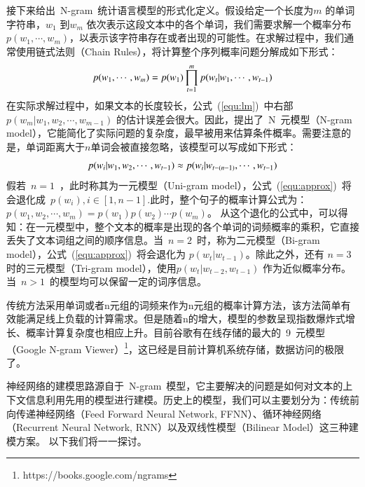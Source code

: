 接下来给出~N-gram~统计语言模型的形式化定义。假设给定一个长度为$m$ 的单词字符串，$w_1$ 到$w_m$ 依次表示这段文本中的各个单词，我们需要求解一个概率分布$p(w_1,\cdots,w_m)$，以表示该字符串存在或者出现的可能性。在求解过程中，我们通常使用链式法则（Chain Rules），将计算整个序列概率问题分解成如下形式：
\begin{equation}
\setlength{\abovedisplayskip}{6pt}
\setlength{\belowdisplayskip}{6pt}
\label{equ:lm}
p(w_1,\cdots,w_m) =p(w_1)\prod_{t=1}^{m}p(w_t|w_1,\cdots,w_{t-1})
\end{equation}
在实际求解过程中，如果文本的长度较长，公式~(\ref{equ:lm})~中右部~$p(w_m | w_1,w_2,\cdots,w_{m-1}) $ 的估计误差会很大。因此，提出了~N~元模型（N-gram model），它能简化了实际问题的复杂度，最早被用来估算条件概率。需要注意的是，单词距离大于$n$单词会被直接忽略，该模型可以写成如下形式：
\begin{equation}
\setlength{\abovedisplayskip}{6pt}
\setlength{\belowdisplayskip}{6pt}
\label{equ:approx}
p(w_i | w_1,w_2,\cdots,w_{t-1})  \approx p(w_i | w_{t-(n-1)},\cdots,w_{t-1})
\end{equation}
假若~$n=1$~，此时称其为一元模型（Uni-gram model），公式~(\ref{equ:approx})~将会退化成~$p(w_i),i\in [1,n-1]$.此时，整个句子的概率计算公式为：~$p(w_1,w_2,\cdots,w_m) = p(w_1)p(w_2) \cdots p(w_m)$。
从这个退化的公式中，可以得知：在一元模型中，整个文本的概率是出现的各个单词的词频概率的乘积，它直接丢失了文本词组之间的顺序信息。当~$n = 2$~时，称为二元模型（Bi-gram model），公式~(\ref{equ:approx})~将会退化为 $p(w_t|w_{t-1})$。除此之外，还有 $n=3$ 时的三元模型（Tri-gram model），使用$p(w_t |w_{t-2},w_{t-1})$ 作为近似概率分布。当~$n>1$~的模型均可以保留一定的词序信息。

传统方法采用单词或者n元组的词频来作为n元组的概率计算方法，该方法简单有效能满足线上负载的计算需求。但是随着n的增大，模型的参数呈现指数爆炸式增长、概率计算复杂度也相应上升。目前谷歌有在线存储的最大的~9~元模型（Google N-gram Viewer）\footnote{https://books.google.com/ngrams}，这已经是目前计算机系统存储，数据访问的极限了。


神经网络的建模思路源自于~N-gram~模型，它主要解决的问题是如何对文本的上下文信息利用先用的模型进行建模。历史上的模型，我们可以主要划分为：传统前向传递神经网络（Feed Forward Neural Network, FFNN）、循环神经网络（Recurrent Neural Network, RNN）以及双线性模型（Bilinear Model）这三种建模方案。 以下我们将一一探讨。


